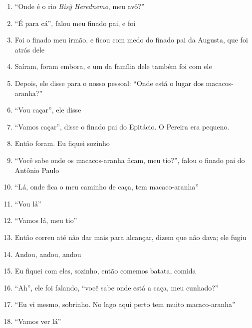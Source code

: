 \begin{enumerate}
 \item ``Onde é o rio \textit{Bisỹ Herednemo}, meu avô?''

 \item ``É para cá'', falou meu finado pai, e foi

 \item Foi o finado meu irmão, e ficou com medo do finado pai da Augusta,
 que foi atrás dele

 \item Saíram, foram embora, e um da família dele também foi com ele

 \item Depois, ele disse para o nosso pessoal: ``Onde está o lugar dos
 macacos- aranha?''

 \item ``Vou caçar'', ele disse

 \item ``Vamos caçar'', disse o finado pai do Epitácio. O Pereira era pequeno.

 \item Então foram. Eu fiquei sozinho

 \begin{center}\end{center}

 \item ``Você sabe onde os macacos-aranha ficam, meu tio?'', falou o finado pai do Antônio Paulo

 \item ``Lá, onde fica o meu caminho de caça, tem macaco-aranha''

 \item ``Vou lá''

 \item ``Vamos lá, meu tio''

 \item Então correu até não dar mais para alcançar, dizem que não dava; ele fugiu

 \item Andou, andou, andou

 \item Eu fiquei com eles, sozinho, então comemos batata, comida

 \item ``Ah'', ele foi falando, ``você sabe onde está a caça, meu cunhado?''

 \item ``Eu vi mesmo, sobrinho. No lago aqui perto tem muito macaco-aranha''

 \item ``Vamos ver lá''


\end{enumerate}
